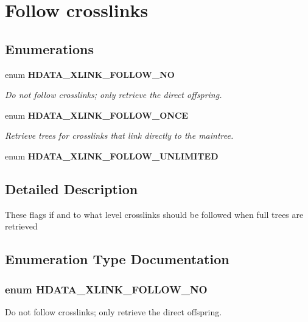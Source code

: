 \section{Follow crosslinks}
\label{group__HDATA__FollowXLink}
\subsection*{Enumerations}
\begin{DoxyCompactItemize}
\item 
enum {\bf HDATA\_\-XLINK\_\-FOLLOW\_\-NO} 
\begin{DoxyCompactList}\small\item\em Do not follow crosslinks; only retrieve the direct offspring. \end{DoxyCompactList}\item 
enum {\bf HDATA\_\-XLINK\_\-FOLLOW\_\-ONCE} 
\begin{DoxyCompactList}\small\item\em Retrieve trees for crosslinks that link directly to the maintree. \end{DoxyCompactList}\item 
enum {\bf HDATA\_\-XLINK\_\-FOLLOW\_\-UNLIMITED} 
\end{DoxyCompactItemize}


\subsection{Detailed Description}
These flags if and to what level crosslinks should be followed when full trees are retrieved 

\subsection{Enumeration Type Documentation}
\subsubsection[{HDATA\_\-XLINK\_\-FOLLOW\_\-NO}]{\setlength{\rightskip}{0pt plus 5cm}enum {\bf HDATA\_\-XLINK\_\-FOLLOW\_\-NO}}\label{group__HDATA__FollowXLink_ga621a720020ad830bc44e142b282e0e09}


Do not follow crosslinks; only retrieve the direct offspring. 

